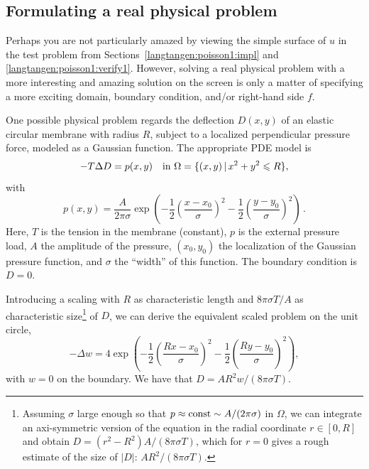 \subsection{Formulating a real physical problem}
\label{langtangen:poisson:membrane}

Perhaps you are not particularly
amazed by viewing the simple surface of $u$ in the
test problem from Sections~\ref{langtangen:poisson1:impl}
and \ref{langtangen:poisson1:verify1}.
However, solving a real physical problem with a more interesting and amazing
solution on the screen
is only a matter
of specifying a more exciting domain, boundary condition, and/or
right-hand side $f$.

One possible physical problem regards the deflection
$D(x,y)$ of an elastic circular membrane
with radius $R$, subject to a localized perpendicular pressure
force, modeled as a Gaussian function.
The appropriate PDE model is
\begin{equation}
-T\Delta D = p(x,y)\quad\hbox{in }\Omega = \{ (x,y)\,|\, x^2+y^2\leqslant R\},
\end{equation}
with
\begin{equation}
p(x,y) = \frac{A}{2\pi\sigma}\exp{\left(
- \frac{1}{2}\left( \frac{x-x_0}{\sigma}\right)^2
- \frac{1}{2}\left( \frac{y-y_0}{\sigma}\right)^2
\right)}\, .
\end{equation}
Here, $T$ is the tension in the membrane (constant), $p$ is the external
pressure load,
$A$ the amplitude of the pressure, $(x_0,y_0)$ the localization of
the Gaussian pressure function, and $\sigma$ the ``width'' of this
function. The boundary condition is $D=0$.

Introducing a scaling with $R$ as characteristic length and
$8\pi\sigma T/A$ as characteristic size\footnote{
Assuming $\sigma$ large enough so that
$p\approx\hbox{const} \sim A/(2\pi\sigma)$
in $\Omega$, we can integrate an axi-symmetric version of the
equation in the radial coordinate $r\in [0,R]$
and obtain $D=(r^2-R^2)A/(8\pi\sigma T)$,
which for $r=0$ gives a rough estimate of the size of $|D|$:
$AR^2/(8\pi\sigma T)$.}
 of $D$, we can derive the equivalent
scaled problem on the unit circle,
\begin{equation}
\label{langtangen:poisson1:membrane:scaled:eq}
-\Delta w =
4\exp{\left(
- \frac{1}{2}\left( \frac{Rx-x_0}{\sigma}\right)^2
- \frac{1}{2}\left( \frac{Ry-y_0}{\sigma}\right)^2
\right)},
\end{equation}
with $w=0$ on the boundary. We have that $D = AR^2w/(8\pi\sigma T)$.

